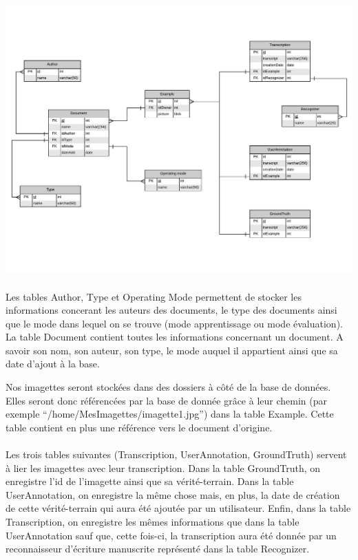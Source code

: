 \begin{mdframed}[frametitle={Figure 7 : Modèle entité association de la Base de données}, innerbottommargin=10]
\begin{center}
\includegraphics[scale=0.6]{Modele_entite_association.pdf}
\end{center}
\end{mdframed}

\paragraph{}

Les tables Author, Type et Operating Mode permettent de stocker les informations concerant les auteurs des documents, le type des documents ainsi que le mode dans lequel on se trouve (mode apprentissage ou mode évaluation).
La table Document contient toutes les informations concernant un document. A savoir son nom, son auteur, son type, le mode auquel il appartient ainsi que sa date d’ajout à la base.

Nos imagettes seront stockées dans des dossiers à côté de la base de données. Elles seront donc référencées par la base de donnée grâce à leur chemin (par exemple “/home/MesImagettes/imagette1.jpg”) dans la table Example. Cette table contient en plus une référence vers le document d’origine.

\paragraph{}

Les trois tables suivantes (Transcription, UserAnnotation, GroundTruth) servent à lier les imagettes avec leur transcription. Dans la table GroundTruth, on enregistre l’id de l’imagette ainsi que sa vérité-terrain. Dans la table UserAnnotation, on enregistre la même chose mais, en plus, la date de création de cette vérité-terrain qui aura été ajoutée par un utilisateur. Enfin, dans la table Transcription, on enregistre les mêmes informations que dans la table UserAnnotation sauf que, cette fois-ci, la transcription aura été donnée par un reconnaisseur d’écriture manuscrite représenté dans la table Recognizer.

